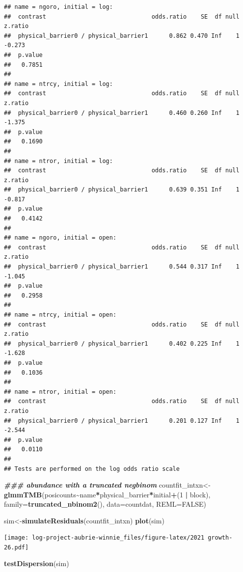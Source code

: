 \documentclass[
]{article}
\newenvironment{Shaded}{\begin{snugshade}}{\end{snugshade}}
\newcommand{\AttributeTok}[1]{\textcolor[rgb]{0.13,0.29,0.53}{#1}}
\newcommand{\ConstantTok}[1]{\textcolor[rgb]{0.56,0.35,0.01}{#1}}
\newcommand{\DecValTok}[1]{\textcolor[rgb]{0.00,0.00,0.81}{#1}}
\newcommand{\DocumentationTok}[1]{\textcolor[rgb]{0.56,0.35,0.01}{\textbf{\textit{#1}}}}
\newcommand{\FunctionTok}[1]{\textcolor[rgb]{0.13,0.29,0.53}{\textbf{#1}}}
\newcommand{\NormalTok}[1]{#1}
\newcommand{\OtherTok}[1]{\textcolor[rgb]{0.56,0.35,0.01}{#1}}
\newcommand{\SpecialCharTok}[1]{\textcolor[rgb]{0.81,0.36,0.00}{\textbf{#1}}}
\begin{document}
\begin{verbatim}
## name = ngoro, initial = log:
##  contrast                              odds.ratio    SE  df null z.ratio
##  physical_barrier0 / physical_barrier1      0.862 0.470 Inf    1  -0.273
##  p.value
##   0.7851
## 
## name = ntrcy, initial = log:
##  contrast                              odds.ratio    SE  df null z.ratio
##  physical_barrier0 / physical_barrier1      0.460 0.260 Inf    1  -1.375
##  p.value
##   0.1690
## 
## name = ntror, initial = log:
##  contrast                              odds.ratio    SE  df null z.ratio
##  physical_barrier0 / physical_barrier1      0.639 0.351 Inf    1  -0.817
##  p.value
##   0.4142
## 
## name = ngoro, initial = open:
##  contrast                              odds.ratio    SE  df null z.ratio
##  physical_barrier0 / physical_barrier1      0.544 0.317 Inf    1  -1.045
##  p.value
##   0.2958
## 
## name = ntrcy, initial = open:
##  contrast                              odds.ratio    SE  df null z.ratio
##  physical_barrier0 / physical_barrier1      0.402 0.225 Inf    1  -1.628
##  p.value
##   0.1036
## 
## name = ntror, initial = open:
##  contrast                              odds.ratio    SE  df null z.ratio
##  physical_barrier0 / physical_barrier1      0.201 0.127 Inf    1  -2.544
##  p.value
##   0.0110
## 
## Tests are performed on the log odds ratio scale
\end{verbatim}

\begin{Shaded}
\begin{Highlighting}[]
\DocumentationTok{\#\#\# abundance with a truncated negbinom }
\NormalTok{countfit\_intxn}\OtherTok{\textless{}{-}}\FunctionTok{glmmTMB}\NormalTok{(posicounts}\SpecialCharTok{\textasciitilde{}}\NormalTok{name}\SpecialCharTok{*}\NormalTok{physical\_barrier}\SpecialCharTok{*}\NormalTok{initial}\SpecialCharTok{+}\NormalTok{(}\DecValTok{1} \SpecialCharTok{|}\NormalTok{ block), }\AttributeTok{family=}\FunctionTok{truncated\_nbinom2}\NormalTok{(), }\AttributeTok{data=}\NormalTok{countdat, }\AttributeTok{REML=}\ConstantTok{FALSE}\NormalTok{)}

\NormalTok{sim}\OtherTok{\textless{}{-}}\FunctionTok{simulateResiduals}\NormalTok{(countfit\_intxn)}
\FunctionTok{plot}\NormalTok{(sim)}
\end{Highlighting}
\end{Shaded}

\texttt{[image: log-project-aubrie-winnie\_files/figure-latex/2021 growth-26.pdf]}

\begin{Shaded}
\begin{Highlighting}[]
\FunctionTok{testDispersion}\NormalTok{(sim)}
\end{Highlighting}
\end{Shaded}
\end{document}
